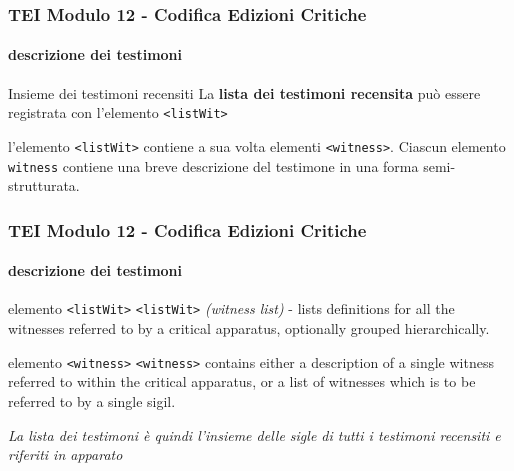 \begin{frame}
    \frametitle{TEI Modulo 12 - Codifica Edizioni Critiche}
    \framesubtitle{descrizione dei testimoni}
    \addtocounter{nframe}{1}





    
    \begin{block}{Insieme dei testimoni recensiti}
        La \textbf{lista dei testimoni recensita} può essere registrata con l'elemento \texttt{<listWit>}
    \end{block}

    \begin{center}
        l'elemento \texttt{<listWit>} contiene a sua volta elementi \texttt{<witness>}. Ciascun elemento \texttt{witness} contiene una breve descrizione del testimone in una forma semi-strutturata. 
    \end{center}
    
   
\end{frame}


\begin{frame}
    \frametitle{TEI Modulo 12 - Codifica Edizioni Critiche}
    \framesubtitle{descrizione dei testimoni}
    \addtocounter{nframe}{1}

    
    \begin{block}{elemento \texttt{<listWit>}}
        \texttt{<listWit>} \textit{(witness list)} - lists definitions for all the witnesses referred to by a critical apparatus, optionally grouped hierarchically.
    \end{block}

    \begin{block}{elemento \texttt{<witness>}}
        \texttt{<witness>} contains either a description of a single witness referred to within the critical apparatus, or a list of witnesses which is to be referred to by a single sigil.
    \end{block}
    
    \textit{La lista dei testimoni è quindi l'insieme delle sigle di tutti i testimoni recensiti e riferiti in apparato}
   
\end{frame}


